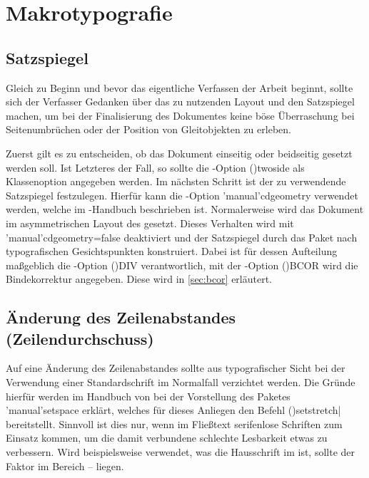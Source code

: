 \documentclass[%
  english,ngerman,%
  cdgeometry=no,DIV=12,%
  cd=false,cdfont=false,cdtitle=true,%
  headings=normal,%
  automark,%
  listof=toc,%
]{tudscrartcl}
\begin{document}
\section{Makrotypografie}
\subsection{Satzspiegel}

Gleich zu Beginn und bevor das eigentliche Verfassen der Arbeit beginnt, sollte 
sich der Verfasser Gedanken über das zu nutzenden Layout und den Satzspiegel 
machen, um bei der Finalisierung des Dokumentes keine böse Überraschung bei 
Seitenumbrüchen oder der Position von Gleitobjekten zu erleben.

Zuerst gilt es zu entscheiden, ob das Dokument einseitig oder beidseitig 
gesetzt werden soll. Ist Letzteres der Fall, so sollte die \KOMAScript-Option 
\Option(){twoside} als Klassenoption angegeben werden. Im 
nächsten Schritt ist der zu verwendende Satzspiegel festzulegen. Hierfür kann 
die \TUDScript-Option \Option'manual'{cdgeometry} verwendet werden, welche im 
\TUDScript-Handbuch beschrieben ist. Normalerweise wird das Dokument im 
asymmetrischen Layout des \CDs gesetzt.
%
Dieses Verhalten wird mit \Option*'manual'{cdgeometry=false} deaktiviert und 
der Satzspiegel durch das Paket  nach typografischen 
Gesichtspunkten konstruiert. Dabei ist für dessen Aufteilung maßgeblich die 
\KOMAScript-Option \Option(){DIV} verantwortlich, mit der 
\KOMAScript-Option \Option(){BCOR} wird die Bindekorrektur 
angegeben. Diese wird in \autoref{sec:bcor} erläutert.



\subsection{Änderung des Zeilenabstandes (Zeilendurchschuss)}

Auf eine Änderung des Zeilenabstandes sollte aus typografischer Sicht bei der 
Verwendung einer Standardschrift im Normalfall verzichtet werden. Die Gründe 
hierfür werden im Handbuch von \TUDScript bei der Vorstellung des Paketes 
\Package'manual'{setspace} erklärt, welches für dieses Anliegen den Befehl 
\Macro(){setstretch|} bereitstellt. 
Sinnvoll ist dies nur, wenn im Fließtext serifenlose Schriften zum Einsatz 
kommen, um die damit verbundene schlechte Lesbarkeit etwas zu verbessern.
Wird beispielsweise \OpenSans verwendet, was die Hausschrift im \TUDCD ist, 
sollte der Faktor im Bereich \nobreakdashes-- liegen.
\end{document}
